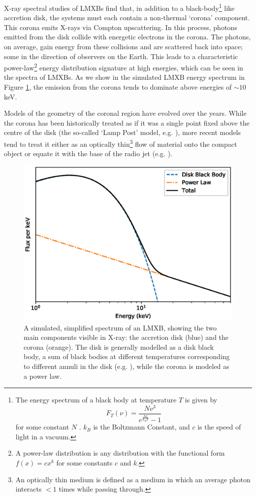 \par X-ray spectral studies of LMXBs find that, in addition to a black-body\footnote{The energy spectrum of a black body at temperature $T$ is given by \[F_T(\nu)=\frac{N\nu^3}{e^\frac{h\nu}{k_BT}-1}\] for some constant $N$ \citep{Planck}.  $k_B$ is the Boltzmann Constant, and $c$ is the speed of light in a vacuum.} like accretion disk, the systems must each contain a non-thermal `corona' component.  This corona emits X-rays via Compton upscattering.  In this process, photons emitted from the disk collide with energetic electrons in the corona.  The photons, on average, gain energy from these collisions and are scattered back into space; some in the direction of observers on the Earth.  This leads to a characteristic power-law\footnote{A power-law distribution is any distribution with the functional form $f(x)=cx^k$ for some constants $c$ and $k$.} energy distribution signature at high energies, which can be seen in the spectra of LMXBs.  As we show in the simulated LMXB energy spectrum in Figure \ref{fig:toyspec}, the emission from the corona tends to dominate above energies of $\sim10$\,keV.
\par Models of the geometry of the coronal region have evolved over the years.  While the corona has been historically treated as if it was a single point fixed above the centre of the disk (the so-called `Lamp Post' model, e.g. \citealp{Rozanska_Lamppost}), more recent models tend to treat it either as an optically thin\footnote{An optically thin medium is defined as a medium in which an average photon interacts $<1$ times while passing through.} flow of material onto the compact object or equate it with the base of the radio jet (e.g. \citealp{Skipper_CoronaGeo}).

\begin{figure}
   \centering
    \includegraphics[width=0.7\columnwidth, trim = 10mm 0mm 10mm 10mm, clip]{images/toy_spec.eps}
    \captionsetup{singlelinecheck=off}
    \caption[A simulated, simplified spectrum of an LMXB, showing the two main components visible in X-ray: the accretion disk and the corona.]{A simulated, simplified spectrum of an LMXB, showing the two main components visible in X-ray: the accretion disk (blue) and the corona (orange).  The disk is generally modelled as a disk black body, a sum of black bodies at different temperatures corresponding to different annuli in the disk (e.g. \citealp{Mitsuda_diskbb}), while the corona is modeled as a power law.}
   \label{fig:toyspec}
\end{figure}

